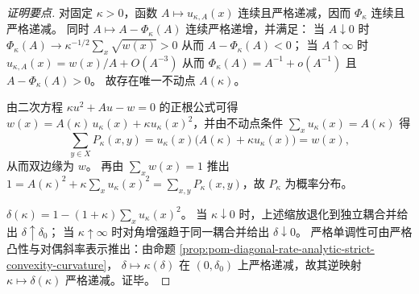\begin{proof}[证明要点]
对固定 \(\kappa>0\)，函数 \(A\mapsto u_{\kappa,A}(x)\) 连续且严格递减，因而 \(\Phi_\kappa\) 连续且严格递减。
同时 \(A\mapsto A-\Phi_\kappa(A)\) 连续严格递增，并满足：
当 \(A\downarrow 0\) 时 \(\Phi_\kappa(A)\to \kappa^{-1/2}\sum_x\sqrt{w(x)}>0\) 从而 \(A-\Phi_\kappa(A)<0\)；
当 \(A\uparrow\infty\) 时 \(u_{\kappa,A}(x)=w(x)/A+O(A^{-3})\) 从而 \(\Phi_\kappa(A)=A^{-1}+o(A^{-1})\) 且 \(A-\Phi_\kappa(A)>0\)。
故存在唯一不动点 \(A(\kappa)\)。
\par
由二次方程 \(\kappa u^2+Au-w=0\) 的正根公式可得
\(
w(x)=A(\kappa)\,u_\kappa(x)+\kappa u_\kappa(x)^2
\)，并由不动点条件 \(\sum_x u_\kappa(x)=A(\kappa)\) 得
\[
\sum_{y\in X}P_\kappa(x,y)=u_\kappa(x)\bigl(A(\kappa)+\kappa u_\kappa(x)\bigr)=w(x),
\]
从而双边缘为 \(w\)。
再由 \(\sum_x w(x)=1\) 推出
\(
1=A(\kappa)^2+\kappa\sum_x u_\kappa(x)^2
=\sum_{x,y}P_\kappa(x,y)
\)，故 \(P_\kappa\) 为概率分布。
\par
\(\delta(\kappa)=1-(1+\kappa)\sum_x u_\kappa(x)^2\)。
当 \(\kappa\downarrow 0\) 时，上述缩放退化到独立耦合并给出 \(\delta\uparrow \delta_0\)；
当 \(\kappa\uparrow\infty\) 时对角增强趋于同一耦合并给出 \(\delta\downarrow 0\)。
严格单调性可由严格凸性与对偶斜率表示推出：由命题 \ref{prop:pom-diagonal-rate-analytic-strict-convexity-curvature}，
\(\delta\mapsto\kappa(\delta)\) 在 \((0,\delta_0)\) 上严格递减，故其逆映射 \(\kappa\mapsto\delta(\kappa)\) 严格递减。证毕。
\end{proof}

